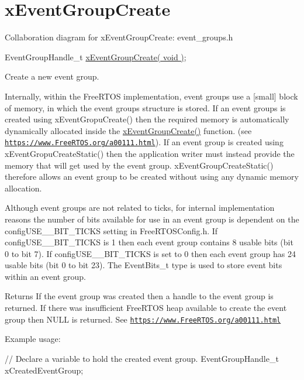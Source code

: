 \hypertarget{group__x_event_group_create}{}\section{x\+Event\+Group\+Create}
\label{group__x_event_group_create}
Collaboration diagram for x\+Event\+Group\+Create\+:
event\+\_\+groups.\+h 
\begin{DoxyPre}
EventGroupHandle\_t \hyperlink{vendor_2ceedling_2plugins_2freertos_2src_2freertos_2include_2event__groups_8h_a7ed741a0902718aca9c8d3ca273f1b73}{xEventGroupCreate( void )};
\end{DoxyPre}


Create a new event group.

Internally, within the Free\+R\+T\+OS implementation, event groups use a \mbox{[}small\mbox{]} block of memory, in which the event group\textquotesingle{}s structure is stored. If an event groups is created using x\+Event\+Gropu\+Create() then the required memory is automatically dynamically allocated inside the \hyperlink{vendor_2ceedling_2plugins_2freertos_2src_2freertos_2include_2event__groups_8h_a7ed741a0902718aca9c8d3ca273f1b73}{x\+Event\+Group\+Create()} function. (see \href{https://www.FreeRTOS.org/a00111.html}{\tt https\+://www.\+Free\+R\+T\+O\+S.\+org/a00111.\+html}). If an event group is created using x\+Event\+Gropu\+Create\+Static() then the application writer must instead provide the memory that will get used by the event group. x\+Event\+Group\+Create\+Static() therefore allows an event group to be created without using any dynamic memory allocation.

Although event groups are not related to ticks, for internal implementation reasons the number of bits available for use in an event group is dependent on the config\+U\+S\+E\+\_\+\_\+\+B\+I\+T\+\_\+\+T\+I\+C\+KS setting in Free\+R\+T\+O\+S\+Config.\+h. If config\+U\+S\+E\+\_\+\_\+\+B\+I\+T\+\_\+\+T\+I\+C\+KS is 1 then each event group contains 8 usable bits (bit 0 to bit 7). If config\+U\+S\+E\+\_\+\_\+\+B\+I\+T\+\_\+\+T\+I\+C\+KS is set to 0 then each event group has 24 usable bits (bit 0 to bit 23). The Event\+Bits\+\_\+t type is used to store event bits within an event group.

\begin{DoxyReturn}{Returns}
If the event group was created then a handle to the event group is returned. If there was insufficient Free\+R\+T\+OS heap available to create the event group then N\+U\+LL is returned. See \href{https://www.FreeRTOS.org/a00111.html}{\tt https\+://www.\+Free\+R\+T\+O\+S.\+org/a00111.\+html}
\end{DoxyReturn}
Example usage\+: 
\begin{DoxyPre}
 // Declare a variable to hold the created event group.
 EventGroupHandle\_t xCreatedEventGroup;\end{DoxyPre}



